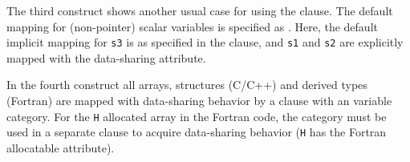 The third  construct shows another usual case for using the  clause.
The default mapping for (non-pointer) scalar variables is specified as .
Here, the default implicit mapping for \texttt{s3} is  as specified 
in the  clause, and \texttt{s1} and \texttt{s2} are explicitly 
mapped with the  data-sharing attribute.

In the fourth  construct all arrays, structures (C/C++) and derived 
types (Fortran) are mapped with  data-sharing behavior by a 
 clause with an  variable category.
For the \texttt{H} allocated array in the Fortran code, the  
category must be used in a separate  clause to acquire 
 data-sharing behavior (\texttt{H} has the Fortran allocatable attribute).


